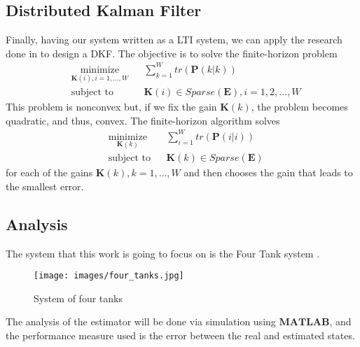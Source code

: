 \subsection{Distributed Kalman Filter}
Finally, having our system written as a LTI system, we can apply the research done in \cite{viegas2018discrete} to design a DKF. The objective is to solve the finite-horizon problem 
\begin{equation} \label{eq:4.9}
\begin{aligned}
& \underset{\boldsymbol{K}(i),i=1,...,W}{\text{minimize}}
& & \sum_{k=1}^{W}tr(\boldsymbol{P}(k|k)) \\
& \text{subject to}
& & \boldsymbol{K}(i) \in Sparse(\boldsymbol{E}), i=1,2, \dots, W
\end{aligned}
\end{equation}
This problem is nonconvex but, if we fix the gain $\boldsymbol{K}(k)$, the problem becomes quadratic, and thus, convex. The finite-horizon algorithm solves 
\begin{equation} \label{eq:4.10}
\begin{aligned}
& \underset{\boldsymbol{K}(k)}{\text{minimize}}
& & \sum_{i=1}^{W}tr(\boldsymbol{P}(i|i)) \\
& \text{subject to}
& & \boldsymbol{K}(k) \in Sparse(\boldsymbol{E})
\end{aligned}
\end{equation}
for each of the gains $\boldsymbol{K}(k), k=1,\dots,W$ and then chooses the gain that leads to the smallest error.

\subsection{Analysis}
The system that this work is going to focus on is the Four Tank system \cite{jayaprakash2014state}.
\begin{figure}[h]
  \centering
  \texttt{[image: images/four\_tanks.jpg]}
  \caption{System of four tanks}
  \label{fig:four_tanks}
\end{figure}
\par
The analysis of the estimator will be done via simulation using $\boldsymbol{MATLAB}$, and the performance measure used is the error between the real and estimated states.
